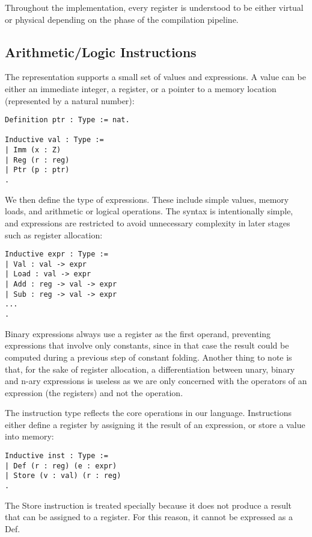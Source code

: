 Throughout the implementation, every register is understood to be either virtual or physical depending on the phase of the compilation pipeline.

\subsection{Arithmetic/Logic Instructions}

The representation supports a small set of values and expressions. A value can be either an immediate integer, a register, or a pointer to a memory location (represented by a natural number):

\begin{lstlisting}[language=Coq]
Definition ptr : Type := nat.

Inductive val : Type :=
| Imm (x : Z)
| Reg (r : reg)
| Ptr (p : ptr)
.
\end{lstlisting}

We then define the type of expressions. These include simple values, memory loads, and arithmetic or logical operations. The syntax is intentionally simple, and expressions are restricted to avoid unnecessary complexity in later stages such as register allocation:

\begin{lstlisting}[language=Coq]
Inductive expr : Type :=
| Val : val -> expr
| Load : val -> expr
| Add : reg -> val -> expr
| Sub : reg -> val -> expr
...
.
\end{lstlisting}

Binary expressions always use a register as the first operand, preventing expressions that involve only constants, since in that case the result could be computed during a previous step of constant folding. Another thing to note is that, for the sake of register allocation, a differentiation between unary, binary and n-ary expressions is useless as we are only concerned with the operators of an expression (the registers) and not the operation.

The instruction type reflects the core operations in our language. Instructions either define a register by assigning it the result of an expression, or store a value into memory:

\begin{lstlisting}[language=Coq]
Inductive inst : Type :=
| Def (r : reg) (e : expr)
| Store (v : val) (r : reg)
.
\end{lstlisting}

The Store instruction is treated specially because it does not produce a result that can be assigned to a register. For this reason, it cannot be expressed as a Def.

